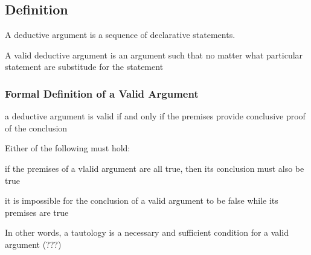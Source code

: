 \documentclass[12pt]{article}
\begin{document}
\subsection{Definition}

A deductive argument is a sequence of declarative statements.

A valid deductive argument is an argument such that no matter what particular
statement are substitude for the statement 


\subsubsection{Formal Definition of a Valid Argument}

a deductive argument is valid if and only if the premises provide conclusive
proof of the conclusion

Either of the following must hold:

if the premises of a vlalid argument are all true, then its conclusion must also be true

it is impossible for the conclusion of a valid argument to be false while its premises are true

In other words, a tautology is a necessary and sufficient condition for a valid argument (???)
\end{document}
